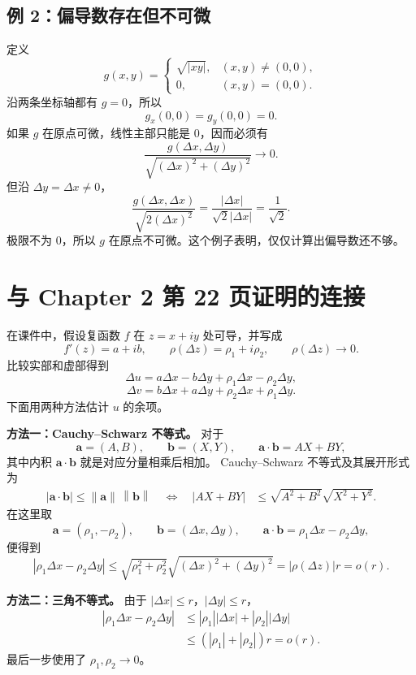 \documentclass[UTF8,11pt]{ctexart}
\newcommand{\abs}[1]{\left\lvert#1\right\rvert}
\newcommand{\norm}[1]{\left\lVert#1\right\rVert}
\begin{document}
\subsection*{例 2：偏导数存在但不可微}

定义
\[
g(x,y)=
\begin{cases}
\sqrt{\abs{xy}},&(x,y)\neq(0,0),\\
0,&(x,y)=(0,0).
\end{cases}
\]
沿两条坐标轴都有 $g=0$，所以
\[
g_x(0,0)=g_y(0,0)=0.
\]
如果 $g$ 在原点可微，线性主部只能是 $0$，因而必须有
\[
\frac{g(\Delta x,\Delta y)}
{\sqrt{(\Delta x)^2+(\Delta y)^2}}\longrightarrow0.
\]
但沿 $\Delta y=\Delta x\neq0$，
\[
\frac{g(\Delta x,\Delta x)}
{\sqrt{2(\Delta x)^2}}
=\frac{\abs{\Delta x}}{\sqrt2\abs{\Delta x}}
=\frac1{\sqrt2}.
\]
极限不为 $0$，所以 $g$ 在原点不可微。这个例子表明，仅仅计算出偏导数还不够。

\section{与 Chapter 2 第 22 页证明的连接}

在课件中，假设复函数 $f$ 在 $z=x+iy$ 处可导，并写成
\[
f'(z)=a+ib,\qquad
\rho(\Delta z)=\rho_1+i\rho_2,
\qquad \rho(\Delta z)\to0.
\]
比较实部和虚部得到
\[
\Delta u
=a\Delta x-b\Delta y
+\rho_1\Delta x-\rho_2\Delta y,
\]
\[
\Delta v
=b\Delta x+a\Delta y
+\rho_2\Delta x+\rho_1\Delta y.
\]
下面用两种方法估计 $u$ 的余项。

\noindent\textbf{方法一：Cauchy--Schwarz 不等式。}
对于
\[
\mathbf{a}=(A,B),\qquad
\mathbf{b}=(X,Y),\qquad
\mathbf{a}\cdot\mathbf{b}=AX+BY,
\]
其中内积 $\mathbf{a}\cdot\mathbf{b}$ 就是对应分量相乘后相加。
Cauchy--Schwarz 不等式及其展开形式为
\[
\begin{aligned}
\boxed{\abs{\mathbf{a}\cdot\mathbf{b}}
       \leq\norm{\mathbf{a}}\,\norm{\mathbf{b}}}
\quad\Longleftrightarrow\quad
\abs{AX+BY}
&\leq\sqrt{A^2+B^2}\sqrt{X^2+Y^2}.
\end{aligned}
\]
在这里取
\[
\mathbf{a}=(\rho_1,-\rho_2),
\qquad
\mathbf{b}=(\Delta x,\Delta y),
\qquad
\mathbf{a}\cdot\mathbf{b}
=\rho_1\Delta x-\rho_2\Delta y,
\]
便得到
\[
\abs{\rho_1\Delta x-\rho_2\Delta y}
\leq
\sqrt{\rho_1^2+\rho_2^2}
\sqrt{(\Delta x)^2+(\Delta y)^2}
=\abs{\rho(\Delta z)}r=o(r).
\]

\noindent\textbf{方法二：三角不等式。}
由于 $\abs{\Delta x}\leq r$，$\abs{\Delta y}\leq r$，
\[
\begin{aligned}
\abs{\rho_1\Delta x-\rho_2\Delta y}
&\leq\abs{\rho_1}\abs{\Delta x}
     +\abs{\rho_2}\abs{\Delta y}\\
&\leq(\abs{\rho_1}+\abs{\rho_2})r=o(r).
\end{aligned}
\]
最后一步使用了 $\rho_1,\rho_2\to0$。
\end{document}
